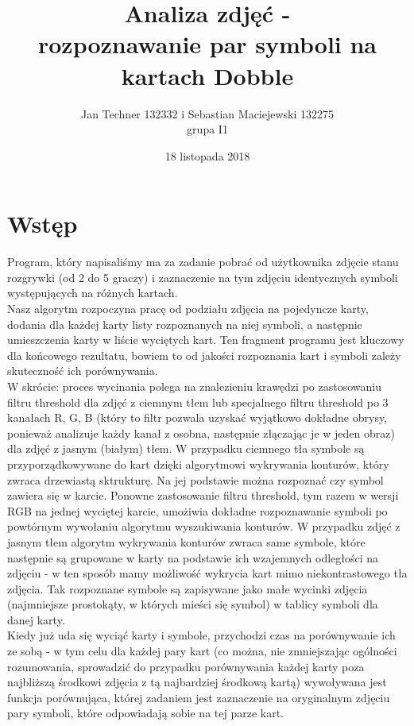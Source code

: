 \documentclass[10pt,a4paper]{article}
\author{Jan Techner 132332 i Sebastian Maciejewski 132275 \\ grupa I1}
\title{Analiza zdjęć - \\ rozpoznawanie par symboli na kartach Dobble}
\date{18 listopada 2018}
\newcommand{\forceindent}{\leavevmode{\parindent=3em\indent}}
\begin{document}
\maketitle

\section{Wstęp}

\forceindent Program, który napisaliśmy ma za zadanie pobrać od użytkownika zdjęcie stanu rozgrywki (od 2 do 5 graczy) i zaznaczenie na tym zdjęciu identycznych symboli występujących na różnych kartach. \\
Nasz algorytm rozpoczyna pracę od podziału zdjęcia na pojedyncze karty, dodania dla każdej karty listy rozpoznanych na niej symboli, a następnie umieszczenia karty w 
liście wyciętych kart. Ten fragment programu jest kluczowy dla końcowego rezultatu, bowiem to od jakości rozpoznania kart i symboli zależy skuteczność ich porównywania. \\

W skrócie: proces wycinania polega na znalezieniu krawędzi po zastosowaniu filtru threshold dla zdjęć z ciemnym tłem lub specjalnego filtru threshold po 3 kanałach R, G, B (który to filtr pozwala uzyskać wyjątkowo dokładne obrysy, ponieważ analizuje każdy kanał z osobna, następnie złączając je w jeden obraz) dla zdjęć z jasnym (białym) tłem. W przypadku ciemnego tła symbole są przyporządkowywane do kart dzięki algorytmowi wykrywania konturów, który zwraca drzewiastą sktrukturę. Na jej podstawie można rozpoznać czy symbol zawiera się w karcie. Ponowne zastosowanie filtru threshold, tym razem w wersji RGB na jednej wyciętej karcie, umożiwia dokładne rozpoznawanie symboli po powtórnym wywołaniu algorytmu wyszukiwania konturów. W przypadku zdjęć z jasnym tłem algorytm wykrywania konturów zwraca same symbole, które następnie są grupowane w karty na podstawie ich wzajemnych odległości na zdjęciu - w ten sposób mamy możliwość wykrycia kart mimo niekontrastowego tła zdjęcia. Tak rozpoznane symbole są zapisywane jako małe wycinki zdjęcia (najmniejsze prostokąty, w których mieści się symbol) w tablicy symboli dla danej karty. \\

Kiedy już uda się wyciąć karty i symbole, przychodzi czas na porównywanie ich ze sobą - w tym celu dla każdej pary kart (co można, nie zmniejszając ogólności rozumowania, sprowadzić do przypadku porównywania każdej karty poza najbliższą środkowi zdjęcia z tą najbardziej środkową kartą) wywoływana jest funkcja porównująca, której zadaniem jest zaznaczenie na oryginalnym zdjęciu pary symboli, które odpowiadają sobie na tej parze kart. 
\end{document}
